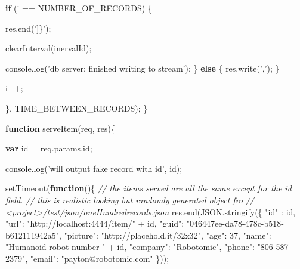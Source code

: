 \documentclass[12pt, ]{article}
\newenvironment{Shaded}{}{}
\newcommand{\KeywordTok}[1]{\textcolor[rgb]{0.00,0.44,0.13}{\textbf{{#1}}}}
\newcommand{\DecValTok}[1]{\textcolor[rgb]{0.25,0.63,0.44}{{#1}}}
\newcommand{\StringTok}[1]{\textcolor[rgb]{0.25,0.44,0.63}{{#1}}}
\newcommand{\CommentTok}[1]{\textcolor[rgb]{0.38,0.63,0.69}{\textit{{#1}}}}
\newcommand{\OtherTok}[1]{\textcolor[rgb]{0.00,0.44,0.13}{{#1}}}
\newcommand{\FunctionTok}[1]{\textcolor[rgb]{0.02,0.16,0.49}{{#1}}}
\newcommand{\NormalTok}[1]{{#1}}
\begin{document}
\begin{Shaded}
\begin{Highlighting}[]
{      \KeywordTok{if} \NormalTok{(i == NUMBER_OF_RECORDS) \{}

         \OtherTok{res}\NormalTok{.}\FunctionTok{end}\NormalTok{(}\StringTok{']\}'}\NormalTok{);}
         
         \FunctionTok{clearInterval}\NormalTok{(inervalId);}
         
         \OtherTok{console}\NormalTok{.}\FunctionTok{log}\NormalTok{(}\StringTok{'db server: finished writing to stream'}\NormalTok{);}
      \NormalTok{\} }\KeywordTok{else} \NormalTok{\{}
         \OtherTok{res}\NormalTok{.}\FunctionTok{write}\NormalTok{(}\StringTok{','}\NormalTok{);}
      \NormalTok{\}}
      
      \NormalTok{i++;  }

   \NormalTok{\}, TIME_BETWEEN_RECORDS);}
\NormalTok{\}}

\KeywordTok{function} \FunctionTok{serveItem}\NormalTok{(req, res)\{}

   \KeywordTok{var} \NormalTok{id = }\OtherTok{req}\NormalTok{.}\OtherTok{params}\NormalTok{.}\FunctionTok{id}\NormalTok{;}
   
   \OtherTok{console}\NormalTok{.}\FunctionTok{log}\NormalTok{(}\StringTok{'will output fake record with id'}\NormalTok{, id);     }

   \FunctionTok{setTimeout}\NormalTok{(}\KeywordTok{function}\NormalTok{()\{}
      \CommentTok{// the items served are all the same except for the id field.}
      \CommentTok{// this is realistic looking but randomly generated object fro}
      \CommentTok{// <project>/test/json/oneHundredrecords.json   }
      \OtherTok{res}\NormalTok{.}\FunctionTok{end}\NormalTok{(}\OtherTok{JSON}\NormalTok{.}\FunctionTok{stringify}\NormalTok{(\{}
         \StringTok{"id"} \NormalTok{: id,}
         \StringTok{"url"}\NormalTok{: }\StringTok{"http://localhost:4444/item/"} \NormalTok{+ id,      }
         \StringTok{"guid"}\NormalTok{: }\StringTok{"046447ee-da78-478c-b518-b612111942a5"}\NormalTok{,}
         \StringTok{"picture"}\NormalTok{: }\StringTok{"http://placehold.it/32x32"}\NormalTok{,}
         \StringTok{"age"}\NormalTok{: }\DecValTok{37}\NormalTok{,}
         \StringTok{"name"}\NormalTok{: }\StringTok{"Humanoid robot number "} \NormalTok{+ id,}
         \StringTok{"company"}\NormalTok{: }\StringTok{"Robotomic"}\NormalTok{,}
         \StringTok{"phone"}\NormalTok{: }\StringTok{"806-587-2379"}\NormalTok{,}
         \StringTok{"email"}\NormalTok{: }\StringTok{"payton@robotomic.com"}
      \NormalTok{\}));}
            
}
\end{Highlighting}
\end{Shaded}
\end{document}
